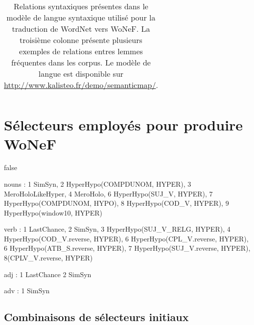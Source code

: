 \documentclass[oneside,parskip,draft]{scrbook}
\begin{document}
\begin{longtable}{lll}
    \caption{\label{table:relationswonef}Relations syntaxiques présentes dans
        le modèle de langue syntaxique utilisé pour la traduction de WordNet
        vers WoNeF. La troisième colonne présente plusieurs exemples de
        relations entres lemmes fréquentes dans les corpus. Le modèle de langue
    est disponible sur \protect\url{http://www.kalisteo.fr/demo/semanticmap/}.}
\end{longtable}



\section{Sélecteurs employés pour produire WoNeF}

\if false

nouns : 1 SimSyn, 2 HyperHypo(COMPDUNOM, HYPER), 3 MeroHoloLikeHyper, 4 MeroHolo, 6 HyperHypo(SUJ\_V, HYPER), 7 HyperHypo(COMPDUNOM, HYPO), 8 HyperHypo(COD\_V, HYPER), 9 HyperHypo(window10, HYPER)

verb :  1 LastChance, 2 SimSyn, 3 HyperHypo(SUJ\_V\_RELG, HYPER), 4 HyperHypo(COD\_V.reverse, HYPER), 6 HyperHypo(CPL\_V.reverse, HYPER), 6 HyperHypo(ATB\_S.reverse, HYPER), 7 HyperHypo(SUJ\_V.reverse, HYPER), 8(CPLV\_V.reverse, HYPER)

adj : 1 LastChance 2 SimSyn

adv : 1 SimSyn

\fi

\subsection{Combinaisons de sélecteurs initiaux}
\end{document}
